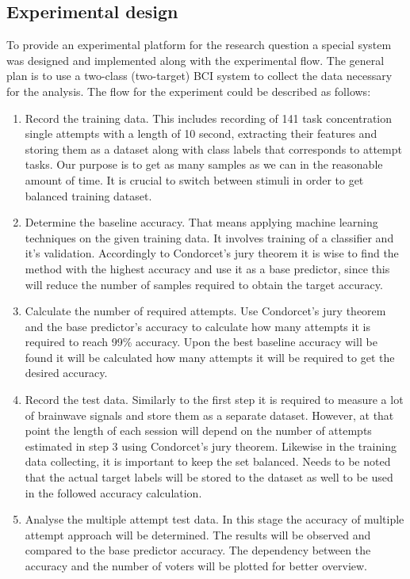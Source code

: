 \documentclass[12pt]{article}
\theoremstyle{definition}
\begin{document}
\subsection{Experimental design}
To provide an experimental platform for the research question a special system was designed and implemented along with the experimental flow. The general plan is to use a two-class (two-target) BCI system to collect the data necessary for the analysis. The flow for the experiment could be described as follows:
\begin{enumerate}
\item Record the training data. This includes recording of 141 task concentration single attempts with a length of 10 second, extracting their features and storing them as a dataset along with class labels that corresponds to attempt tasks. Our purpose is to get as many samples as we can in the reasonable amount of time. It is crucial to switch between stimuli in order to get balanced training dataset.
\item Determine the baseline accuracy. That means applying machine learning techniques on the given training data. It involves training of a classifier and it's validation. Accordingly to Condorcet's jury theorem it is wise to find the method with the highest accuracy and use it as a base predictor, since this will reduce the number of samples required to obtain the target accuracy. 
\item Calculate the number of required attempts. Use Condorcet's jury theorem and the base predictor's accuracy to calculate how many attempts it is required to reach 99\% accuracy.
Upon the best baseline accuracy will be found it will be calculated how many attempts it will be required to get the desired accuracy.
\item Record the test data. Similarly to the first step it is required to measure a lot of brainwave signals and store them as a separate dataset. However, at that point the length of each session will depend on the number of attempts estimated in step 3 using Condorcet's jury theorem. Likewise in the training data collecting, it is important to keep the set balanced. Needs to be noted that the actual target labels will be stored to the dataset as well to be used in the followed accuracy calculation.
\item Analyse the multiple attempt test data. In this stage the accuracy of multiple attempt approach will be determined. The results will be observed and compared to the base predictor accuracy. The dependency between the accuracy and the number of voters will be plotted for better overview.
\end{enumerate}
\end{document}
